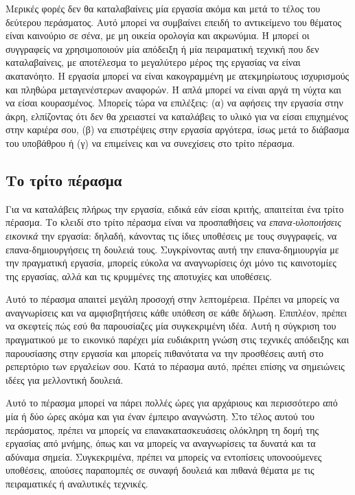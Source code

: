 \documentclass{article}
\begin{document}
\par
Μερικές φορές δεν θα καταλαβαίνεις μία εργασία ακόμα και μετά το τέλος του δεύτερου περάσματος. Αυτό μπορεί να συμβαίνει επειδή το αντικείμενο του θέματος είναι καινούριο σε σένα, με μη οικεία ορολογία και ακρωνύμια. Ή μπορεί οι συγγραφείς να χρησιμοποιούν μία απόδειξη ή μία πειραματική τεχνική που δεν καταλαβαίνεις, με αποτέλεσμα το μεγαλύτερο μέρος της εργασίας να είναι ακατανόητο. Η εργασία μπορεί να είναι κακογραμμένη με ατεκμηρίωτους ισχυρισμούς και πληθώρα μεταγενέστερων αναφορών. Ή απλά μπορεί να είναι αργά τη νύχτα και να είσαι κουρασμένος. Μπορείς τώρα να επιλέξεις: (α) να αφήσεις την εργασία στην άκρη, ελπίζοντας ότι δεν θα χρειαστεί να καταλάβεις το υλικό για να είσαι επιχημένος στην καριέρα σου, (β) να επιστρέψεις στην εργασία αργότερα, ίσως μετά το διάβασμα του υποβάθρου ή (γ) να επιμείνεις και να συνεχίσεις στο τρίτο πέρασμα.
\subsection{Το τρίτο πέρασμα}
\par
Για να καταλάβεις πλήρως την εργασία, ειδικά εάν είσαι κριτής, απαιτείται ένα τρίτο πέρασμα. Το κλειδί στο τρίτο πέρασμα είναι να προσπαθήσεις να \textit{επανα-υλοποιήσεις εικονικά} την εργασία: δηλαδή, κάνοντας τις ίδιες υποθέσεις με τους συγγραφείς, να επανα-δημιουργήσεις τη δουλειά τους. Συγκρίνοντας αυτή την επανα-δημιουργία με την πραγματική εργασία, μπορείς εύκολα να αναγνωρίσεις όχι μόνο τις καινοτομίες της εργασίας, αλλά και τις κρυμμένες της αποτυχίες και υποθέσεις.
\par
Αυτό το πέρασμα απαιτεί μεγάλη προσοχή στην λεπτομέρεια. Πρέπει να μπορείς να αναγνωρίσεις και να αμφισβητήσεις κάθε υπόθεση σε κάθε δήλωση. Επιπλέον, πρέπει να σκεφτείς πώς εσύ θα παρουσίαζες μία συγκεκριμένη ιδέα. Αυτή η σύγκριση του πραγματικού με το εικονικό παρέχει μία ευδιάκριτη γνώση στις τεχνικές απόδειξης και παρουσίασης στην εργασία και μπορείς πιθανότατα να την προσθέσεις αυτή στο ρεπερτόριο των εργαλείων σου. Κατά το πέρασμα αυτό, πρέπει επίσης να σημειώνεις ιδέες για μελλοντική δουλειά.
\par
Αυτό το πέρασμα μπορεί να πάρει πολλές ώρες για αρχάριους και περισσότερο από μία ή δύο ώρες ακόμα και για έναν έμπειρο αναγνώστη. Στο τέλος αυτού του περάσματος, πρέπει να μπορείς να επανακατασκευάσεις ολόκληρη τη δομή της εργασίας από μνήμης, όπως και να μπορείς να αναγνωρίσεις τα δυνατά και τα αδύναμα σημεία. Συγκεκριμένα, πρέπει να μπορείς να εντοπίσεις υπονοούμενες υποθέσεις, απούσες παραπομπές σε συναφή δουλειά και πιθανά θέματα με τις πειραματικές ή αναλυτικές τεχνικές.
\end{document}

